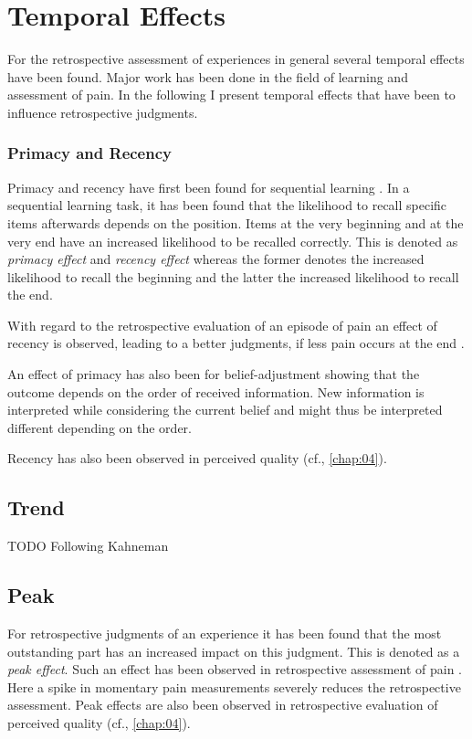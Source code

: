 
\section{Temporal Effects}

For the retrospective assessment of experiences in general several temporal effects have been found.
Major work has been done in the field of learning and assessment of pain.
In the following I present temporal effects that have been to influence retrospective judgments.

\subsubsection*{Primacy and Recency}
Primacy and recency have first been found for sequential learning \citep[cf.,][]{murdock_jr._serial_1962}.
In a sequential learning task, it has been found that the likelihood to recall specific items afterwards depends on the position.
Items at the very beginning and at the very end have an increased likelihood to be recalled correctly.
This is denoted as \emph{primacy effect} and \emph{recency effect} whereas the former denotes the increased likelihood to recall the beginning and the latter the increased likelihood to recall the end.

With regard to the retrospective evaluation of an episode of pain an effect of recency is observed, leading to a better judgments, if less pain occurs at the end \citep[cf.,][]{kahneman_when_1993, redelmeier_patients_1996}.

An effect of primacy has also been for belief-adjustment showing that the outcome depends on the order of received information.
New information is interpreted while considering the current belief and might thus be interpreted different depending on the order.

Recency has also been observed in perceived quality (cf., \autoref{chap:04}).

\subsection*{Trend}

TODO Following Kahneman

\subsection*{Peak}
For retrospective judgments of an experience it has been found that the most outstanding part has an increased impact on this judgment.
This is denoted as a \emph{peak effect}.
Such an effect has been observed in retrospective assessment of pain \citep[cf.,][]{kahneman_when_1993, redelmeier_patients_1996}.
Here a spike in momentary pain measurements severely reduces the retrospective assessment.
Peak effects are also been observed in retrospective evaluation of perceived quality (cf., \autoref{chap:04}).

